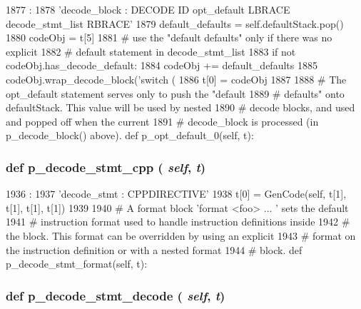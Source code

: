 \begin{DoxyCode}
1877                                :
1878         'decode_block : DECODE ID opt_default LBRACE decode_stmt_list RBRACE'
1879         default_defaults = self.defaultStack.pop()
1880         codeObj = t[5]
1881         # use the "default defaults" only if there was no explicit
1882         # default statement in decode_stmt_list
1883         if not codeObj.has_decode_default:
1884             codeObj += default_defaults
1885         codeObj.wrap_decode_block('switch (%
1886         t[0] = codeObj
1887 
1888     # The opt_default statement serves only to push the "default
1889     # defaults" onto defaultStack.  This value will be used by nested
1890     # decode blocks, and used and popped off when the current
1891     # decode_block is processed (in p_decode_block() above).
    def p_opt_default_0(self, t):
\end{DoxyCode}
\hypertarget{classisa__parser_1_1ISAParser_a906497e3aab08ad0577f3660ba2ffa8b}{
\subsubsection[{p\_\-decode\_\-stmt\_\-cpp}]{\setlength{\rightskip}{0pt plus 5cm}def p\_\-decode\_\-stmt\_\-cpp ( {\em self}, \/   {\em t})}}
\label{classisa__parser_1_1ISAParser_a906497e3aab08ad0577f3660ba2ffa8b}



\begin{DoxyCode}
1936                                   :
1937         'decode_stmt : CPPDIRECTIVE'
1938         t[0] = GenCode(self, t[1], t[1], t[1], t[1])
1939 
1940     # A format block 'format <foo> { ... }' sets the default
1941     # instruction format used to handle instruction definitions inside
1942     # the block.  This format can be overridden by using an explicit
1943     # format on the instruction definition or with a nested format
1944     # block.
    def p_decode_stmt_format(self, t):
\end{DoxyCode}
\hypertarget{classisa__parser_1_1ISAParser_a732b3446dd057bbebee6335a648af7e5}{
\subsubsection[{p\_\-decode\_\-stmt\_\-decode}]{\setlength{\rightskip}{0pt plus 5cm}def p\_\-decode\_\-stmt\_\-decode ( {\em self}, \/   {\em t})}}
\label{classisa__parser_1_1ISAParser_a732b3446dd057bbebee6335a648af7e5}



